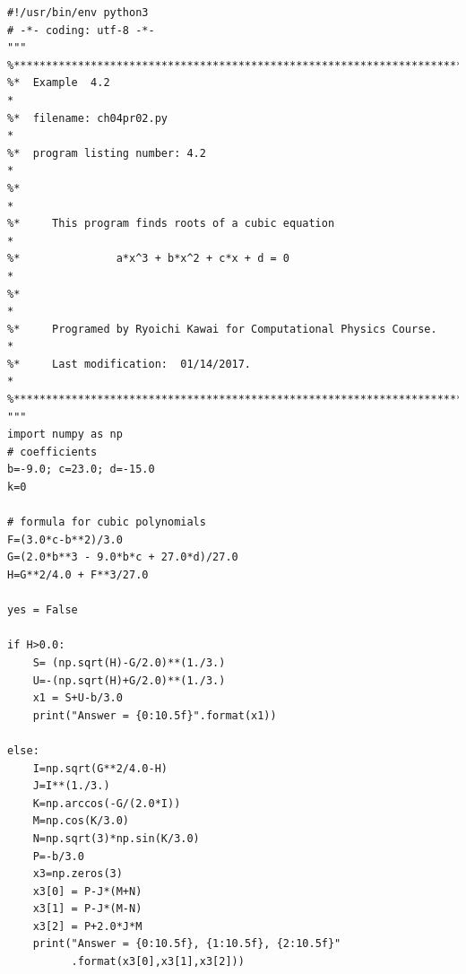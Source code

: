 \bigskip\noindent
\program
\footnotesize
\begin{verbatim}
#!/usr/bin/env python3
# -*- coding: utf-8 -*-
"""
%**************************************************************************
%*  Example  4.2                                                          *
%*  filename: ch04pr02.py                                                 *
%*  program listing number: 4.2                                           *
%*                                                                        *
%*     This program finds roots of a cubic equation                       *
%*               a*x^3 + b*x^2 + c*x + d = 0                              *
%*                                                                        *
%*     Programed by Ryoichi Kawai for Computational Physics Course.       *
%*     Last modification:  01/14/2017.                                    *
%**************************************************************************
"""
import numpy as np
# coefficients
b=-9.0; c=23.0; d=-15.0
k=0

# formula for cubic polynomials
F=(3.0*c-b**2)/3.0
G=(2.0*b**3 - 9.0*b*c + 27.0*d)/27.0
H=G**2/4.0 + F**3/27.0

yes = False

if H>0.0:
    S= (np.sqrt(H)-G/2.0)**(1./3.)
    U=-(np.sqrt(H)+G/2.0)**(1./3.)
    x1 = S+U-b/3.0
    print("Answer = {0:10.5f}".format(x1))

else:
    I=np.sqrt(G**2/4.0-H)
    J=I**(1./3.)
    K=np.arccos(-G/(2.0*I))
    M=np.cos(K/3.0)
    N=np.sqrt(3)*np.sin(K/3.0)
    P=-b/3.0
    x3=np.zeros(3)    
    x3[0] = P-J*(M+N)
    x3[1] = P-J*(M-N)
    x3[2] = P+2.0*J*M
    print("Answer = {0:10.5f}, {1:10.5f}, {2:10.5f}"
          .format(x3[0],x3[1],x3[2]))
\end{verbatim}
\normalsize


